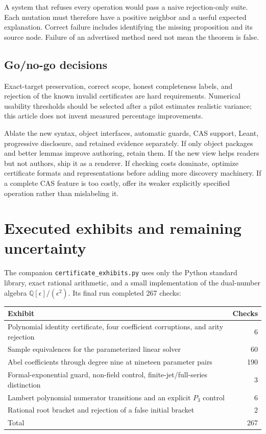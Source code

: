\documentclass[11pt,letterpaper]{article}
\newcommand{\code}[1]{\nolinkurl{#1}}
\newcommand{\Q}{\mathbb Q}
\theoremstyle{definition}
\begin{document}
A system that refuses every operation would pass a naive rejection-only suite.
Each mutation must therefore have a positive neighbor and a useful expected
explanation. Correct failure includes identifying the missing proposition and its
source node. Failure of an advertised method need not mean the theorem is false.

\subsection{Go/no-go decisions}
Exact-target preservation, correct scope, honest completeness labels, and rejection
of the known invalid certificates are hard requirements. Numerical usability
thresholds should be selected after a pilot estimates realistic variance; this
article does not invent measured percentage improvements.

Ablate the new syntax, object interfaces, automatic guards, CAS support, Leant,
progressive disclosure, and retained evidence separately. If only object packages
and better lemmas improve authoring, retain them. If the new view helps readers but
not authors, ship it as a renderer. If checking costs dominate, optimize certificate
formats and representations before adding more discovery machinery. If a complete
CAS feature is too costly, offer its weaker explicitly specified operation rather
than mislabeling it.

\section{Executed exhibits and remaining uncertainty}\label{sec:exhibits}
The companion \code{certificate_exhibits.py} uses only the Python standard library,
exact rational arithmetic, and a small implementation of the dual-number algebra
\(\Q[\epsilon]/(\epsilon^2)\). Its final run completed 267 checks:

\begin{tabularx}{\textwidth}{@{}Y r@{}}
\toprule
Exhibit & Checks \\
\midrule
Polynomial identity certificate, four coefficient corruptions, and arity rejection & 6\\
Sample equivalences for the parameterized linear solver & 60\\
Abel coefficients through degree nine at nineteen parameter pairs & 190\\
Formal-exponential guard, non-field control, finite-jet/full-series distinction & 3\\
Lambert polynomial numerator transitions and an explicit \(P_3\) control & 6\\
Rational root bracket and rejection of a false initial bracket & 2\\
\midrule
Total & 267\\
\bottomrule
\end{tabularx}
\end{document}
